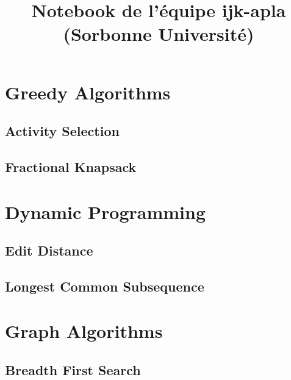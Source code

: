 \documentclass[10pt,a4paper]{article}
\title{\vspace{-4ex}\Large{Notebook de l'équipe \textbf{ijk-apla} (Sorbonne Université)}}
\author{}
\date{}
\begin{document}
\begin{landscape}
\begin{multicols}{2}

\maketitle
\tableofcontents

\section{Greedy Algorithms}

\subsection{Activity Selection}



\subsection{Fractional Knapsack}



\section{Dynamic Programming}

\subsection{Edit Distance}



\subsection{Longest Common Subsequence}



\section{Graph Algorithms}

\subsection{Breadth First Search}


\end{multicols}
\end{landscape}
\end{document}
